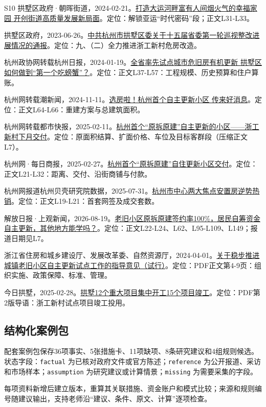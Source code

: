 \documentclass[UTF8,11pt,fontset=windows]{ctexart}
\begin{document}
\vspace{2mm}
\small
\begin{thebibliography}{S10}
 拱墅区政府·朝晖街道，2024-02-21。\href{https://www.gongshu.gov.cn/art/2024/2/21/art\_1229782350\_59079232.html}{打造大运河畔富有人间烟火气的幸福家园 开创街道高质量发展新局面}。定位：解锁亚运“时代密码”段；正文L31-L33。

 拱墅区政府，2023-06-26。\href{https://www.gongshu.gov.cn/art/2023/6/26/art\_1230544\_59075321.html}{中共杭州市拱墅区委关于十五届省委第一轮巡视整改进展情况的通报}。定位：九、（二）全力推进浙工新村危房改造。

 杭州政协网转载杭州日报，2024-01-19。\href{https://www.hzzx.gov.cn/cshz/content/2024-01/19/content\_8677402.htm}{全省率先试点城市危旧房有机更新 拱墅区如何做到“第一个吃螃蟹”？}。定位：正文L37-L57：工程规模、历史预算和住户算账。

 杭州网转载潮新闻，2024-11-11。\href{https://hznews.hangzhou.com.cn/chengshi/content/2024-11/11/content\_8811527\_0.htm}{选房啦！杭州首个自主更新小区 传来好消息}。定位：正文L64-L66：重建方案与总建筑面积。

 杭州网转载都市快报，2025-02-11。\href{https://hwyst.hangzhou.com.cn/mtld/content/2025-02/11/content\_8857599.htm}{杭州首个“原拆原建”自主更新的小区——浙工新村下月交付}。定位：原面积结算、扩面价格、车位及目标客群段（压缩正文L7）。

 杭州网·每日商报，2025-02-27。\href{https://hznews.hangzhou.com.cn/chengshi/content/2025-02/27/content\_8868888.htm}{杭州首个“原拆原建”自住更新小区交付}。定位：正文L21-L32：距离、交付、沿街商铺与付款。

 杭州网报道杭州贝壳研究院数据，2025-07-31。\href{https://hznews.hangzhou.com.cn/jingji/content/2025-07/31/content\_9050608\_2.htm}{杭州市中心两大焦点安置房逆势热销}。定位：正文L19-L21：首套网签及成交套数。

 解放日报·上观新闻，2026-08-19。\href{https://www.jfdaily.com/wx/detail.do?id=1162310}{老旧小区原拆原建签约率100\%，居民自筹资金自主更新，其他地方能学吗？}。定位：正文L22-L24、L62、L95-L109、L149；报道日期见L7。

 浙江省住房和城乡建设厅、发展改革委、自然资源厅，2024-04-01。\href{https://zjjcmspublic.oss-cn-hangzhou-zwynet-d01-a.internet.cloud.zj.gov.cn/jcms\_files/jcms1/web1838/site/attach/0/a66346da98264bbdbadf0310ebc148c6.pdf}{关于稳步推进城镇老旧小区自主更新试点工作的指导意见（试行）}。定位：PDF正文第4-9页：组织实施、政策保障、标准、管理。

 今日拱墅，2025-02-28。\href{https://gsb.qybk.cn/resfile/2025-02-28/02/jrgs-20250228-002.pdf}{拱墅12个重大项目集中开工15个项目竣工}。定位：PDF第2版导语：浙工新村试点项目竣工投用。

\end{thebibliography}
\normalsize
\subsection{结构化案例包}
配套案例包保存36项事实、5张措施卡、11项缺项、8条研究建议和4组规则候选。状态字段：\texttt{factual} 为已核对政府文件或官方陈述；\texttt{reference} 为公开报道、采访和市场样本；\texttt{assumption} 为研究建议或计算情景；\texttt{missing} 为需要采集的字段。

每项资料新增后建立版本，重算其关联措施、资金账户和模式比较；来源和规则编号随建议输出，支持老师沿“建议、条件、原文、计算”逐项检查。
\end{document}
